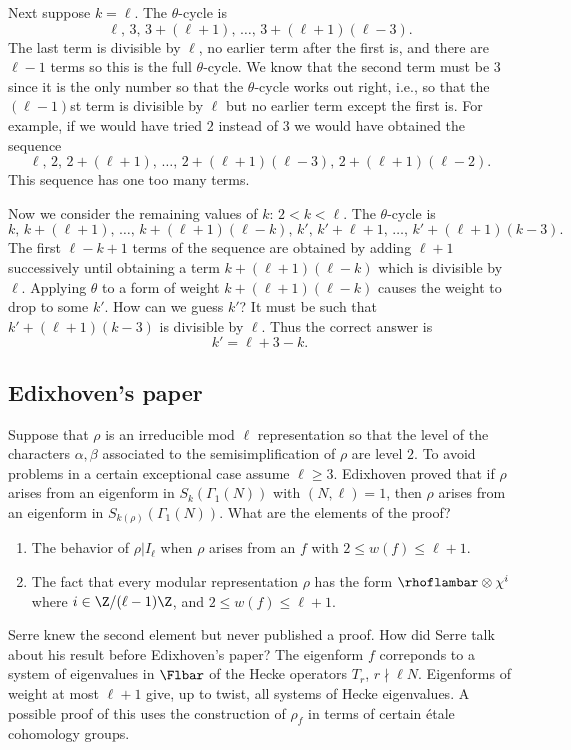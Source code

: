 \documentclass{report}
\begin{document}
Next suppose $k=\ell$. The $\theta$-cycle is
$$\ell,\, 3,\, 3+(\ell+1),\,\ldots,\,3+(\ell+1)(\ell-3).$$
The last term is divisible by $\ell$, no earlier term after the
first is, and there are $\ell-1$ terms so this is
the full $\theta$-cycle.  We know that the second term
must be $3$ since it is the only number so that
the $\theta$-cycle works out right, i.e., so that
the $(\ell-1)$st term is divisible
by $\ell$ but no earlier term except the first is.
For example, if we would have tried $2$ instead
of $3$ we would have obtained the sequence
$$\ell,\, 2,\, 2+(\ell+1),\, \ldots,\,
     2+(\ell+1)(\ell-3),\, 2+(\ell+1)(\ell-2).$$
This sequence has one too many terms.

Now we consider the remaining values of $k$: $2<k<\ell$.
The $\theta$-cycle is
$$k,\, k+(\ell+1),\, \ldots,\, k+(\ell+1)(\ell-k),\,
     k',\, k'+\ell+1,\, \ldots,\, k'+(\ell+1)(k-3).$$
The first $\ell-k+1$ terms of the sequence are obtained by
adding $\ell+1$ successively until obtaining a term $k+(\ell+1)(\ell-k)$
which is divisible by $\ell$.   Applying $\theta$ to a form of weight
$k+(\ell+1)(\ell-k)$ causes the weight to drop to some $k'$.
How can we guess $k'$? It must be such that $k'+(\ell+1)(k-3)$
is divisible by $\ell$. Thus the correct answer is
        $$k'=\ell+3-k.$$

\subsection{Edixhoven's paper}
Suppose that $\rho$ is an irreducible
mod $\ell$ representation so that the level
of the characters $\alpha,\beta$ associated to the semisimplification
of $\rho$ are level $2$.
To avoid problems in a certain exceptional case assume $\ell\geq 3$.
Edixhoven \cite{edixhoven:weight} proved that if $\rho$
arises from an eigenform  in $S_k(\Gamma_1(N))$
with $(N,\ell)=1$, then $\rho$ arises from an
eigenform in $S_{k(\rho)}(\Gamma_1(N))$.
What are the elements of the proof?
\begin{enumerate}
\item The behavior of $\rho|{I_\ell}$ when $\rho$ arises from
an $f$ with $2\leq w(f)\leq \ell+1$.
\item The fact that every modular representation $\rho$
    has the form $\rhoflambar\otimes\chi^i$
   where $i\in\Z/(\ell-1)\Z$, and $2\leq w(f)\leq \ell+1$.
\end{enumerate}
Serre knew the second element but never published a proof.  How did Serre
talk about his result before Edixhoven's paper?
The eigenform $f$ correponds to a system of eigenvalues in
$\Flbar$ of the Hecke operators $T_r$, $r\nmid \ell N$.
Eigenforms of weight at most $\ell+1$ give, up to twist,
all systems of Hecke eigenvalues. A possible proof of this uses
the construction of $\rho_f$ in terms of
certain \'{e}tale cohomology groups.
\end{document}

